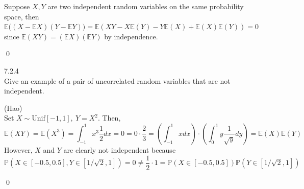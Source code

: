 \begin{answer} Suppose $X,Y$ are two independent random variables on the same probability space, then $\mathbb{E}\big((X-\mathbb{E}X)(Y-\mathbb{E}Y)\big)=\mathbb{E}(XY-X\mathbb{E}(Y)-Y\mathbb{E}(X)+\mathbb{E}(X)\mathbb{E}(Y))=0$ since $\mathbb{E}(XY)=(\mathbb{E}X)(\mathbb{E}Y)$ by independence.
\end{answer}\qed \qquad

\begin{exercise} 7.2.4 \\
Give an example of a pair of uncorrelated random variables that are not independent.
\end{exercise}
\begin{answer} (Hao) \\
Set $X \sim \text{Unif}[-1,1],\  Y = X^2$. Then,
$$\mathbb{E}(XY) = \mathbb{E}(X^3) = \int_{-1}^{1}x^3\frac{1}{2}dx = 0 = 0 \cdot \frac{2}{3} =  (\int_{-1}^{1} x dx) \cdot (\int_0^1 y\frac{1}{\sqrt{y}} dy) = \mathbb{E}(X)\mathbb{E}(Y)$$
However, $X$ and $Y$ are clearly not independent because 
$$\mathbb{P}(X \in [-0.5,0.5], Y \in [1/\sqrt{2},1]) = 0 \neq \frac{1}{2} \cdot 1 = \mathbb{P}(X \in [-0.5,0.5]) \mathbb{P}(Y \in [1/\sqrt{2},1])$$
\end{answer}\qed \qquad

